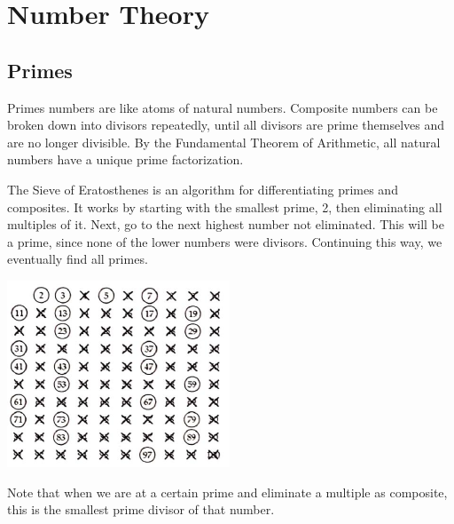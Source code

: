 \documentclass[../main.tex]{subfiles}
\begin{document}
\section{Number Theory}

\subsection{Primes}

Primes numbers are like atoms of natural numbers.
Composite numbers can be broken down into divisors repeatedly,
until all divisors are prime themselves and are no longer divisible.
By the Fundamental Theorem of Arithmetic,
all natural numbers have a unique prime factorization.

The Sieve of Eratosthenes is an algorithm for differentiating primes and composites.
It works by starting with the smallest prime, 2,
then eliminating all multiples of it.
Next, go to the next highest number not eliminated.
This will be a prime, since none of the lower numbers were divisors.
Continuing this way, we eventually find all primes.

\includegraphics{fig/num/1.png}

Note that when we are at a certain prime and eliminate a multiple as composite,
this is the smallest prime divisor of that number.
\end{document}
